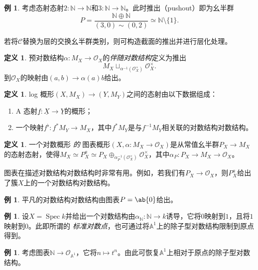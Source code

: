 \documentclass{amsart}
\theoremstyle{definition}
\newtheorem{defn}[thm]{定义}
\newtheorem{exm}[thm]{例}
\theoremstyle{remark}
\theoremstyle{plain}
\theoremstyle{definition}
\theoremstyle{remark}
\newcommand{\A}{\mathbb{A}}
\newcommand{\N}{\mathbb{N}}
\newcommand{\mc}[1]{\mathcal{#1}}
\newcommand{\ul}[1]{\underline{#1}}
\newcommand{\1}{\mathbf{1}}
\newcommand{\2}{\mathbf{2}}
\newcommand{\3}{\mathbf{3}}
\DeclareMathOperator{\Spec}{Spec}
\begin{document}
\begin{exm}
    考虑态射态射\(2 \colon \N \to \N\)和\(3 \colon \N \to \N\)。此时推出（pushout）即为幺半群
    \[ P = \frac{\N \oplus \N}{(3, 0) \sim (0,2)} \simeq \N \setminus \{1\}. \]
\end{exm}

若将\(\mc{C}\)替换为层的交换幺半群类别，则可构造截面的推出并进行层化处理。

\begin{defn}
    预对数结构\(\alpha \colon M_X \to \mc{O}_X\)的\textit{伴随对数结构}定义为推出
    \[ M_X \sqcup_{\alpha^{-1}(\mc{O}_X^{\times})} \mc{O}_X^{\times}. \]
到\(\mc{O}_X\)的映射由\((a,b) \to \alpha(a) b\)给出。
\end{defn}

\begin{defn}
    log 概形\((X, M_X) \to (Y, M_Y)\)之间的态射由以下数据组成：
    \begin{enumerate}
        \item A 态射\(\ul{f} \colon \ul{X} \to \ul{Y}\)的概形；
        \item 一个映射\(f^{\flat} \colon f^* M_Y \to M_X\)，其中\(f^* M_Y\)是与\(f^{-1} M_Y\)相关联的对数结构对数结构。
    \end{enumerate}
\end{defn}

\begin{defn}
一个对数概形 \textit{ 的 } 图表概形\((X, \alpha \colon M_X \to \mc{O}_X)\)是从常值幺半群\(P_X \to M_X\)的态射态射，使得\(M_X \simeq P_X^a \simeq P_X \oplus_{\alpha_P^{-1}(\mc{O}_X^{\times})} \mc{O}_X^{\times}\)，其中\(\alpha_P \colon P_X \to M_X \to \mc{O}_X\)。
\end{defn}

图表在描述对数结构对数结构时非常有用。例如，若我们有\(P_X \to \mc{O}_X\)，则\(P_X^a\)给出了簇\(X\)上的一个对数结构对数结构。

\begin{exm}
平凡的对数结构对数结构由图表\(P = \ab\{0\}\)给出。
\end{exm}

\begin{exm}
    设\(X = \Spec k\)并给出一个对数结构由\(\alpha_{\N} \colon \N \to k\)诱导，它将\(0\)映射到\(1\)，且将\(1\)映射到\(0\)。此即所谓的 \textit{标准对数点}，也可通过将\(\A^1\)上的除子型对数结构限制到原点得到。
\end{exm}

\begin{exm}
    考虑图表\(\N \to \mc{O}_{\A^1}\)，它将\(n \mapsto t^n\)。由此可恢复\(\A^1\)上相对于原点的除子型对数结构。
\end{exm}
\end{document}
